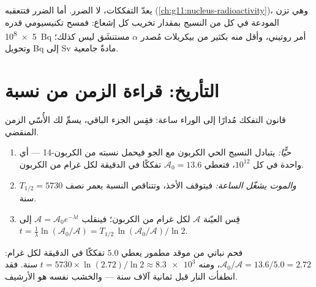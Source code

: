 \begin{remark}\label{rem:g12:radioactive-decay:dose}
 يعدّ التفككات، لا الضرر. أما الضرر فتتعقبه  
 (\cref{ch:g11:nucleus-radioactivity})، وهي تزن 
المودعة في كل  من النسيج بمقدار تخريب كل إشعاع:
فمسح تكنيسيومي قدره \qty{5e8}{Bq} أمر روتيني، وأقل منه بكثير من بيكريلات
مُصدر $\alpha$ مستنشَق ليس كذلك؛ وتحويل \unit{Bq} إلى \unit{Sv} مادةٌ
جامعية.
\end{remark}

\section{التأريخ: قراءة الزمن من نسبة}

قانون التفكك مُدارًا إلى الوراء ساعة: فقِس الجزء الباقي،
يسمِّ لك الأُسّي الزمن المنقضي.

\begin{method}\label{met:g12:radioactive-decay:carbon}
\begin{enumerate}
  \item \emph{حيًّا:} يتبادل النسيج الحي الكربون مع الجو
        فيحمل نسبته من الكربون-14 --- أي  واحدة في كل $10^{12}$،
        فتعطي $\mathcal A_0 = 13.6$ تفككًا في الدقيقة لكل غرام من الكربون.
  \item \emph{والموت يشغّل الساعة:} فيتوقف الأخذ، وتتناقص النسبة
        بعمر نصف $T_{1/2} = \num{5730}$ سنة.
  \item قِس  العيّنة $\mathcal A$ لكل غرام من الكربون؛
        فينقلب $\mathcal A = \mathcal A_0 e^{-\lambda t}$ إلى
        $t = \frac{1}{\lambda}\ln(\mathcal A_0/\mathcal A)
        = T_{1/2}\,\ln(\mathcal A_0/\mathcal A)/\ln 2$.
\end{enumerate}
\end{method}

\begin{example}\label{ex:g12:radioactive-decay:hearth}
فحم نباتي من موقد مطمور يعطي $5.0$ تفككًا في الدقيقة لكل غرام:
$\mathcal A_0/\mathcal A = 13.6/5.0 = 2.72$، ومنه
$t = \num{5730} \times \ln(2.72)/\ln 2 \approx \num{8.3e3}$ سنة. فقد
انطفأت النار قبل ثمانية آلاف سنة --- والخشب نفسه هو الأرشيف.
\end{example}

